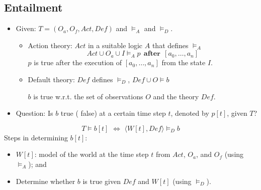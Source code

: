\documentclass[unknownkeysallowed]{beamer}
\begin{document}
\subsection*{Entailment}

\begin{frame}{ }

% 
%  
%
%


 
\begin{itemize} 
\item \alert{Given}: $T = (O_a, O_f, Act, \textit{Def})$ and  $\models_A$ and $\models_D$. 

\begin{itemize}
%
\item \alert{Action theory}:  $Act$ in a suitable logic $A$ that defines $\models_A$ 
\[
Act \cup O_a \cup I \models_A p \: \: \mathbf{ after } \: \: [a_0,\ldots,a_n] 
\] 
$p$ is true after the execution of   $[a_0,\ldots,a_n]$ 
from the state $I$.

\item \alert{Default theory}: $\textit{Def}$ defines $\models_D$,   
$
\textit{Def} \cup O \models b
$ 

$b$ is true w.r.t. the set of observations $O$ and the theory $\textit{Def}$.
\end{itemize}





\item \alert{Question}: Is $b$ true ( false) at a certain time step $t$, denoted by $p[t]$, given $T$? 
\end{itemize} 
\[
T \models b[t] \,\,\Leftrightarrow\,\, \langle W[t], Def \rangle \models_D b \label{entail} 
\]
Steps in determining $b[t]$:
\begin{itemize}
\item $W[t]$: model of the world  at the time step $t$ from  $Act$, $O_a$, and $O_f$ (using $\models_A$); and  
\item Determine  whether $b$ is true  given  $\textit{Def}$ and $W[t]$ (using $\models_D$). 
\end{itemize}

\end{frame}
\end{document}
